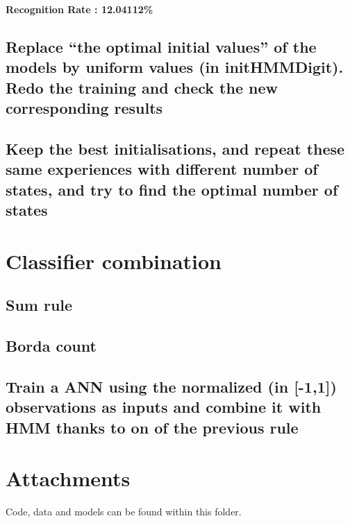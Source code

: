 \documentclass[a4paper]{article}
\begin{document}
\hspace{20mm}
\linebreak

\textbf{Recognition Rate : 12.04112\%} \newline

\subsection{Replace “the optimal initial values” of the models by uniform values (in initHMMDigit).
Redo the training and check the new corresponding results}

\subsection{Keep the best initialisations, and repeat these same experiences with different number of
states, and try to find the optimal number of states}

\section{Classifier combination}

\subsection{Sum rule}

\subsection{Borda count}

\subsection{Train a ANN using the normalized (in [-1,1]) observations as inputs and combine it with
HMM thanks to on of the previous rule}

\section{Attachments}

Code, data and models can be found within this folder.
\end{document}
